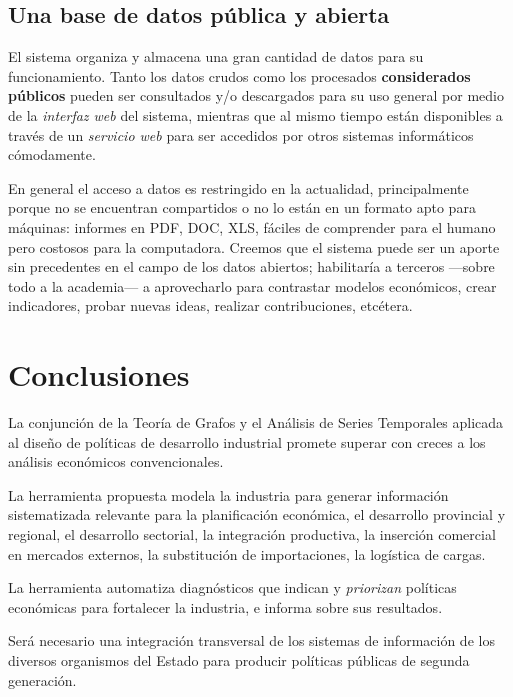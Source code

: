 \documentclass[a4paper]{report}
\begin{document}
\subsection*{Una base de datos pública y abierta}

El sistema organiza y almacena una gran cantidad de datos para su funcionamiento. Tanto los datos crudos como los procesados \textbf{considerados públicos} pueden ser consultados y/o descargados para su uso general por medio de la \textit{interfaz web} del sistema, mientras que al mismo tiempo están disponibles a través de un \textit{servicio web} para ser accedidos por otros sistemas informáticos cómodamente.

En general el acceso a datos es restringido en la actualidad, principalmente porque no se encuentran compartidos o no lo están en un formato apto para máquinas: informes en PDF, DOC, XLS, fáciles de comprender para el humano pero costosos para la computadora. Creemos que el sistema puede ser un aporte sin precedentes en el campo de los datos abiertos; habilitaría a terceros —sobre todo a la academia— a aprovecharlo para contrastar modelos económicos, crear indicadores, probar nuevas ideas, realizar contribuciones, etcétera.

\section*{Conclusiones}


La conjunción de la Teoría de Grafos y el Análisis de Series Temporales aplicada al diseño de políticas de desarrollo industrial promete superar con creces a los análisis económicos convencionales.

La herramienta propuesta modela la industria para generar información sistematizada relevante para la planificación económica, el desarrollo provincial y regional, el desarrollo sectorial, la integración productiva, la inserción comercial en mercados externos, la substitución de importaciones, la logística de cargas.

La herramienta automatiza diagnósticos que indican y \textit{priorizan} políticas económicas para fortalecer la industria, e informa sobre sus resultados.

Será necesario una integración transversal de los sistemas de información de los diversos organismos del Estado para producir políticas públicas de segunda generación.
\end{document}
